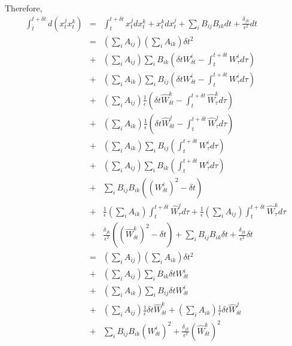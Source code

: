 \documentclass[12pt]{article}
\begin{document}
Therefore, 
\begin{eqnarray}
\int_t^{t + \delta t} d(x_t^j x_t^k) 
&=& \int_t^{t + \delta t} x_t^j dx_t^k + x_t^k dx_t^j + \sum_i B_{ij} B_{ik} dt + \frac{\delta_{jk}}{\epsilon^2} dt \\
&=& \left( \sum_i A_{ij} \right) \left( \sum_i A_{ik} \right) \delta t^2 \\
&+& \left( \sum_i A_{ij} \right) \sum_i B_{ik} \left(\delta t W_{\delta t}^i -\int_t^{t + \delta t} W_\tau^i d\tau \right) \\
&+& \left( \sum_i A_{ik} \right) \sum_i B_{ij} \left(\delta t W_{\delta t}^i -\int_t^{t + \delta t} W_\tau^i d\tau \right) \\
&+& \left( \sum_i A_{ij} \right) \frac{1}{\epsilon} \left(\delta t \hat{W}_{\delta t}^k -\int_t^{t + \delta t} \hat{W}_\tau^k d\tau \right)  \\
&+& \left( \sum_i A_{ik} \right) \frac{1}{\epsilon} \left(\delta t \hat{W}_{\delta t}^j -\int_t^{t + \delta t} \hat{W}_\tau^j d\tau \right)  \\
&+& \left( \sum_i A_{ik} \right) \sum_i B_{ij} \left( \int_t^{t + \delta t} W_\tau^i d\tau \right) \\
&+& \left( \sum_i A_{ij} \right) \sum_i B_{ik} \left( \int_t^{t + \delta t} W_\tau^i d\tau \right) \\
&+& \sum_i B_{ij} B_{ik} \left( \left(W_{\delta t}^i\right)^2 - \delta t \right)  \\
&+& \frac{1}{\epsilon} \left(\sum_i A_{ik} \right) \int_t^{t + \delta t} \hat{W}_\tau^j d\tau 
+ \frac{1}{\epsilon} \left(\sum_i A_{ij} \right) \int_t^{t + \delta t} \hat{W}_\tau^k d\tau \\
&+& \frac{\delta_{jk}}{\epsilon^2} \left((\hat{W}_{\delta t}^k)^2 - \delta t \right) 
+ \sum_i B_{ij} B_{ik} \delta t + \frac{\delta_{jk}}{\epsilon^2} \delta t \\
&=& \left( \sum_i A_{ij} \right) \left( \sum_i A_{ik} \right) \delta t^2 \\
&+& \left( \sum_i A_{ij} \right) \sum_i B_{ik} \delta t W_{\delta t}^i \\
&+& \left( \sum_i A_{ik} \right) \sum_i B_{ij} \delta t W_{\delta t}^i \\
&+& \left( \sum_i A_{ij} \right) \frac{1}{\epsilon} \delta t \hat{W}_{\delta t}^k  
+ \left( \sum_i A_{ik} \right) \frac{1}{\epsilon} \delta t \hat{W}_{\delta t}^j  \\
&+& \sum_i B_{ij} B_{ik} \left(W_{\delta t}^i\right)^2  
+ \frac{\delta_{jk}}{\epsilon^2} (\hat{W}_{\delta t}^k)^2
\end{eqnarray}
\end{document}
